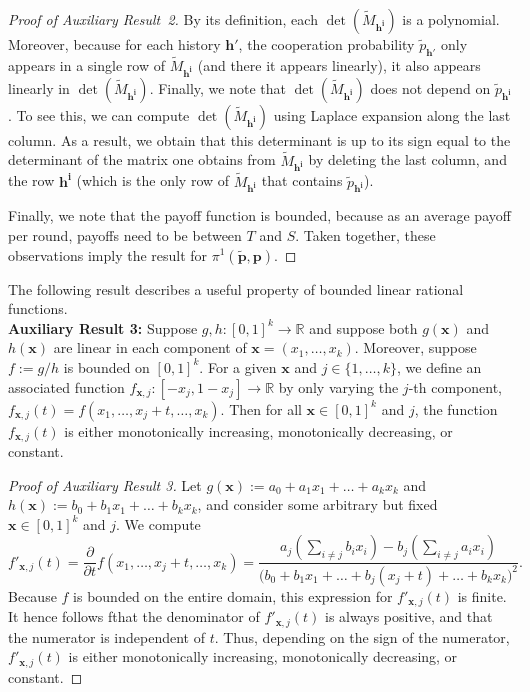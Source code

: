 \documentclass[9pt,twoside,lineno]{pnas-new}
\theoremstyle{plainCl1}
\theoremstyle{plainCl2}
\begin{document}
\begin{proof}[Proof of Auxiliary Result~2]
By its definition, each $\det(\tilde M_\mathbf{h^i})$ is a polynomial. Moreover, because for each history $\mathbf{h'}$, the cooperation probability $\tilde p_\mathbf{h'}$ only appears in a single row of $\tilde M_\mathbf{h^i}$ (and there it appears linearly), it also appears linearly in  $\det(\tilde M_\mathbf{h^i})$. Finally, we note that $\det(\tilde M_\mathbf{h^i})$ does not depend on $\tilde p_\mathbf{h^i}$. To see this, we can compute $\det(\tilde M_\mathbf{h^i})$ using Laplace expansion along the last column. As a result, we obtain that this determinant is up to its sign equal to the determinant of the matrix one obtains from $\tilde M_\mathbf{h^i}$ by deleting the last column, and the row $\mathbf{h^i}$ (which is the only row of $\tilde M_\mathbf{h^i}$ that contains $\tilde p_\mathbf{h^i}$). 

Finally, we note that the payoff function is bounded, because as an average payoff per round, payoffs need to be between $T$ and $S$. Taken together, these observations imply the result for $\pi^1(\mathbf{\tilde p},\mathbf{p})$. 
\end{proof}

\noindent
The following result describes a useful property of bounded linear rational functions.\\

\noindent
{\bf Auxiliary Result 3:} Suppose $g,h:[0,1]^{k}\!\rightarrow\! \mathbb{R}$ and suppose both $g(\mathbf{x})$ and $h(\mathbf{x})$ are linear in each component of $\mathbf{x}\!=\!(x_1,\ldots,x_k)$. 
Moreover, suppose $f\!:=\!g/h$ is bounded on $[0,1]^{k}$. 
For a given $\mathbf{x}$ and $j\!\in\!\{1,\ldots,k\}$, we define an associated function $f_{\mathbf{x},j}:[-x_j,1\!-\!x_j]\to\mathbb{R}$ by only varying the $j$-th component, $f_{\mathbf{x},j}(t) = f(x_1,\ldots,x_j+t,\ldots,x_k)$. Then for all $\mathbf{x}\!\in\![0,1]^k$ and $j$, the function  $f_{\mathbf{x},j}(t)$ is either monotonically increasing, monotonically decreasing, or constant.

\begin{proof}[Proof of Auxiliary Result 3]
Let $g(\mathbf{x}):=a_0\!+\!a_1x_1\!+\!\ldots \!+\!a_k x_k$ and $h(\mathbf{x}):=b_0\!+\!b_1x_1\!+\!\ldots \!+\!b_k x_k$, and consider some arbitrary but fixed $\mathbf{x}\!\in\![0,1]^k$ and $j$. We compute
\begin{equation}
f'_{\mathbf{x},j}(t) = \frac{\partial}{\partial t}  f(x_1,\ldots,x_j+t,\ldots,x_k) = \frac{a_j\left( \sum_{i\neq j} b_i x_i\right) - b_j \left(\sum_{i\neq j} a_i x_i\right)}{\big(b_0+b_1x_1+\ldots+b_j(x_j+t)+\ldots+b_kx_k\big)^2}.
\end{equation}
Because $f$ is bounded on the entire domain, this expression for $f'_{\mathbf{x},j}(t)$ is finite. It hence follows fthat the denominator of $f'_{\mathbf{x},j}(t)$ is always positive, and that the numerator is independent of $t$. Thus, depending on the sign of the numerator, $f'_{\mathbf{x},j}(t)$ is either monotonically increasing, monotonically decreasing, or constant. 
\end{proof}
\end{document}
